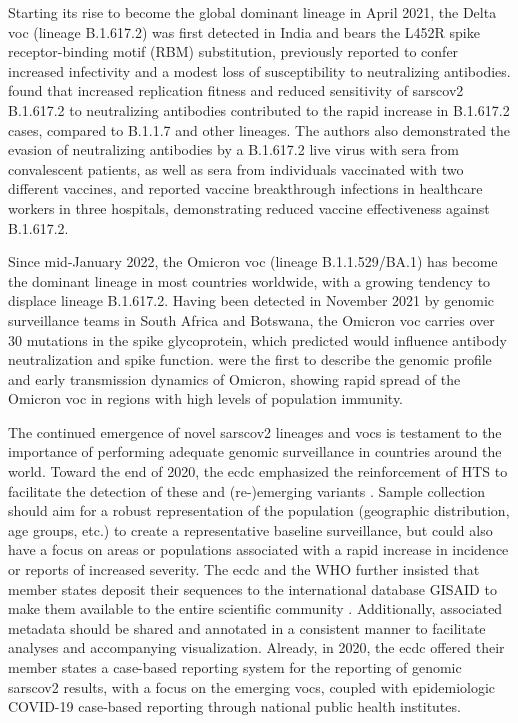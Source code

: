 Starting its rise to become the global dominant lineage in April 2021, the Delta \gls{voc} (lineage B.1.617.2) was first detected in India and bears the L452R spike receptor-binding motif (RBM) substitution, previously reported to confer increased infectivity and a modest loss of susceptibility to neutralizing antibodies.
\citet{mlcochova2021sars-cov-2} found that increased replication fitness and reduced sensitivity of \gls{sarscov2} B.1.617.2 to neutralizing antibodies contributed to the rapid increase in B.1.617.2 cases, compared to B.1.1.7 and other lineages.
The authors also demonstrated the evasion of neutralizing antibodies by a B.1.617.2 live virus with sera from convalescent patients, as well as sera from individuals vaccinated with two different vaccines, and reported vaccine breakthrough infections in healthcare workers in three hospitals, demonstrating reduced vaccine effectiveness against B.1.617.2.

Since mid-January 2022, the Omicron \gls{voc} (lineage B.1.1.529/BA.1) has become the dominant lineage in most countries worldwide, with a growing tendency to displace lineage B.1.617.2.
Having been detected in November 2021 by genomic surveillance teams in South Africa and Botswana, the Omicron \gls{voc} carries over 30 mutations in the spike glycoprotein, which \citet{martin2022selection} predicted would influence antibody neutralization and spike function.
\citet{viana2022rapid} were the first to describe the genomic profile and early transmission dynamics of Omicron, showing rapid spread of the Omicron \gls{voc} in regions with high levels of population immunity.

The continued emergence of novel \gls{sarscov2} lineages and \gls{voc}s is testament to the importance of performing adequate genomic surveillance in countries around the world.
Toward the end of 2020, the \gls{ecdc} emphasized the reinforcement of HTS to facilitate the detection of these and (re-)emerging variants \citep{ecdcSequencing}.
Sample collection should aim for a robust representation of the population (geographic distribution, age groups, etc.) to create a representative baseline surveillance, but could also have a focus on areas or populations associated with a rapid increase in incidence or reports of increased severity.
The \gls{ecdc} and the WHO further insisted that member states deposit their sequences to the international database GISAID \citep{shu2017gisaid} to make them available to the entire scientific community \citep{ecdcSequencing}.
Additionally, associated metadata should be shared and annotated in a consistent manner to facilitate analyses and accompanying visualization.
Already, in 2020, the \gls{ecdc} offered their member states a case-based reporting system for the reporting of genomic \gls{sarscov2} results, with a focus on the emerging \gls{voc}s, coupled with epidemiologic COVID-19 case-based reporting through national public health institutes.

